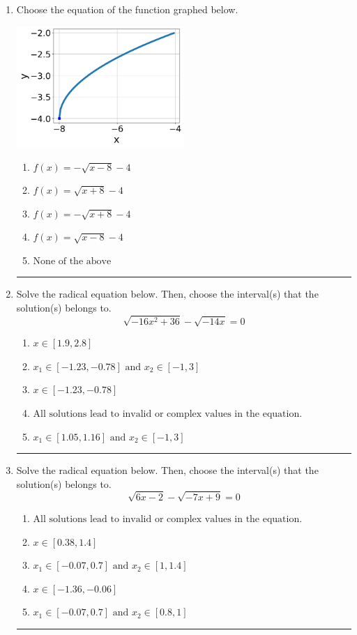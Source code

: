 \documentclass[14pt]{extbook}
\newcommand{\litem}[1]{\item#1\hspace*{-1cm}\rule{\textwidth}{0.4pt}}
\begin{document}
\begin{enumerate}
{\begin{enumerate}[label=\Alph*.]
\end{enumerate} }
\litem{
Choose the equation of the function graphed below.
\begin{center}
    \includegraphics[width=0.5\textwidth]{../Figures/radicalGraphToEquationC.png}
\end{center}
\begin{enumerate}[label=\Alph*.]
\item \( f(x) = - \sqrt{x - 8} - 4 \)
\item \( f(x) = \sqrt{x + 8} - 4 \)
\item \( f(x) = - \sqrt{x + 8} - 4 \)
\item \( f(x) = \sqrt{x - 8} - 4 \)
\item \( \text{None of the above} \)

\end{enumerate} }
\litem{
Solve the radical equation below. Then, choose the interval(s) that the solution(s) belongs to.\[ \sqrt{-16 x^2 + 36} - \sqrt{-14 x} = 0 \]\begin{enumerate}[label=\Alph*.]
\item \( x \in [1.9,2.8] \)
\item \( x_1 \in [-1.23, -0.78] \text{ and } x_2 \in [-1,3] \)
\item \( x \in [-1.23,-0.78] \)
\item \( \text{All solutions lead to invalid or complex values in the equation.} \)
\item \( x_1 \in [1.05, 1.16] \text{ and } x_2 \in [-1,3] \)

\end{enumerate} }
\litem{
Solve the radical equation below. Then, choose the interval(s) that the solution(s) belongs to.\[ \sqrt{6 x - 2} - \sqrt{-7 x + 9} = 0 \]\begin{enumerate}[label=\Alph*.]
\item \( \text{All solutions lead to invalid or complex values in the equation.} \)
\item \( x \in [0.38,1.4] \)
\item \( x_1 \in [-0.07, 0.7] \text{ and } x_2 \in [1,1.4] \)
\item \( x \in [-1.36,-0.06] \)
\item \( x_1 \in [-0.07, 0.7] \text{ and } x_2 \in [0.8,1] \)


\end{enumerate}}
\end{enumerate}
\end{document}
